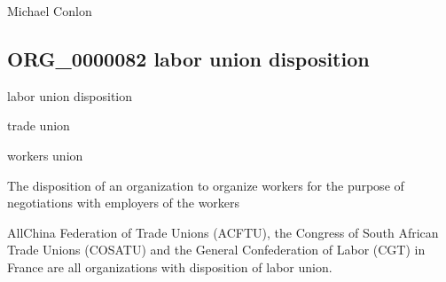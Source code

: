 \documentclass[letterpaper,10pt,english]{sphinxmanual}
\begin{document}
\begin{sphinxShadowBox}

\sphinxAtStartPar
Michael Conlon 
\end{sphinxShadowBox}
\begin{quote}

\ignorespaces \end{quote}


\subsection{ORG\_0000082 \sphinxhyphen{} labor union disposition}
\label{\detokenize{doc-ORG_0000082:org-0000082-labor-union-disposition}}\label{\detokenize{doc-ORG_0000082:index-0}}\label{\detokenize{doc-ORG_0000082::doc}}
\begin{sphinxShadowBox}

\sphinxAtStartPar
labor union disposition
\end{sphinxShadowBox}

\begin{sphinxShadowBox}

\sphinxAtStartPar
trade union

\sphinxAtStartPar
workers union
\end{sphinxShadowBox}

\begin{sphinxShadowBox}

\sphinxAtStartPar
The disposition of an organization to organize workers for the purpose of negotiations with employers of the workers
\end{sphinxShadowBox}

\begin{sphinxShadowBox}

\sphinxAtStartPar
{}
\end{sphinxShadowBox}

\begin{sphinxShadowBox}

\sphinxAtStartPar
All\sphinxhyphen{}China Federation of Trade Unions (ACFTU), the Congress of South African Trade Unions (COSATU) and the General Confederation of Labor (CGT) in France are all organizations with disposition of labor union.
\end{sphinxShadowBox}
\end{document}
